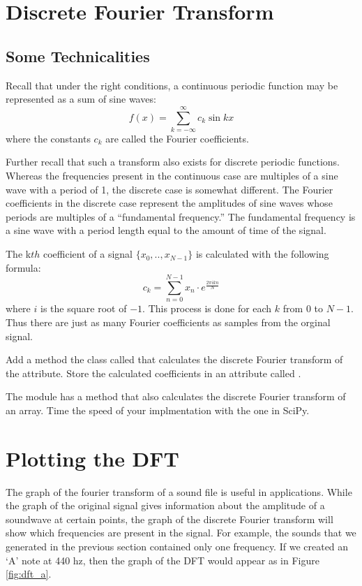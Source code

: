 \section*{Discrete Fourier Transform}

\subsection*{Some Technicalities}

Recall that under the right conditions, a continuous periodic function may be represented as a sum of sine waves:
\[
f(x) = \displaystyle{\sum_{k=-\infty}^{\infty}} c_k \sin{kx}
\]
where the constants $c_k$ are called the Fourier coefficients.

Further recall that such a transform also exists for discrete periodic functions.
Whereas the frequencies present in the continuous case are multiples of a sine wave with a period of 1, the discrete case is somewhat different.
The Fourier coefficients in the discrete case represent the amplitudes of sine waves whose periods are multiples of a ``fundamental frequency.''
The fundamental frequency is a sine wave with a period length equal to the amount of time of the signal.

The k$th$ coefficient of a signal $\{x_0, .., x_{N-1}\}$ is calculated with the following formula:
\[
c_k = \displaystyle{\sum_{n=0}^{N-1}} x_n \cdot e^{\frac{2\pi ikn}{N}}
\]
where $i$ is the square root of $-1$.
This process is done for each $k$ from $0$ to $N-1$.
Thus there are just as many Fourier coefficients as samples from the orginal signal.

\begin{problem}

Add a method the  class called  that calculates the discrete Fourier transform of the  attribute.
Store the calculated coefficients in an attribute called .

The  module has a  method that also calculates the discrete Fourier transform of an array.
Time the speed of your implmentation with the one in SciPy.
\end{problem}


\section*{Plotting the DFT}

The graph of the fourier transform of a sound file is useful in applications.
While the graph of the original signal gives information about the amplitude of a soundwave at certain points, the graph of the discrete Fourier transform will show which frequencies are present in the signal.
For example, the sounds that we generated in the previous section contained only one frequency.
If we created an `A' note at 440 hz, then the graph of the DFT would appear as in Figure \ref{fig:dft_a}.

